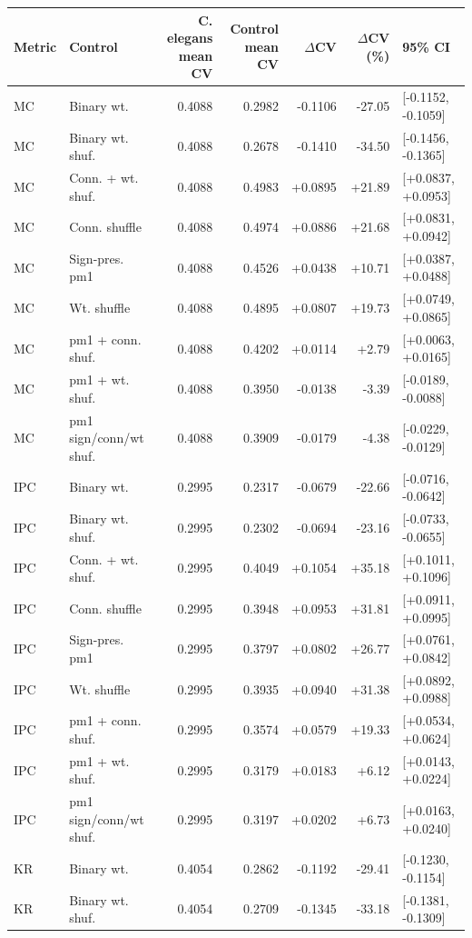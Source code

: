 \begin{tabular}{llrrrrl}
\toprule
Metric & Control & C. elegans mean CV & Control mean CV & $\Delta$CV & $\Delta$CV (\%) & 95\% CI \\
\midrule
MC & Binary wt. & 0.4088 & 0.2982 & -0.1106 & -27.05 & [-0.1152, -0.1059] \\
MC & Binary wt. shuf. & 0.4088 & 0.2678 & -0.1410 & -34.50 & [-0.1456, -0.1365] \\
MC & Conn. + wt. shuf. & 0.4088 & 0.4983 & +0.0895 & +21.89 & [+0.0837, +0.0953] \\
MC & Conn. shuffle & 0.4088 & 0.4974 & +0.0886 & +21.68 & [+0.0831, +0.0942] \\
MC & Sign-pres. pm1 & 0.4088 & 0.4526 & +0.0438 & +10.71 & [+0.0387, +0.0488] \\
MC & Wt. shuffle & 0.4088 & 0.4895 & +0.0807 & +19.73 & [+0.0749, +0.0865] \\
MC & pm1 + conn. shuf. & 0.4088 & 0.4202 & +0.0114 & +2.79 & [+0.0063, +0.0165] \\
MC & pm1 + wt. shuf. & 0.4088 & 0.3950 & -0.0138 & -3.39 & [-0.0189, -0.0088] \\
MC & pm1 sign/conn/wt shuf. & 0.4088 & 0.3909 & -0.0179 & -4.38 & [-0.0229, -0.0129] \\
IPC & Binary wt. & 0.2995 & 0.2317 & -0.0679 & -22.66 & [-0.0716, -0.0642] \\
IPC & Binary wt. shuf. & 0.2995 & 0.2302 & -0.0694 & -23.16 & [-0.0733, -0.0655] \\
IPC & Conn. + wt. shuf. & 0.2995 & 0.4049 & +0.1054 & +35.18 & [+0.1011, +0.1096] \\
IPC & Conn. shuffle & 0.2995 & 0.3948 & +0.0953 & +31.81 & [+0.0911, +0.0995] \\
IPC & Sign-pres. pm1 & 0.2995 & 0.3797 & +0.0802 & +26.77 & [+0.0761, +0.0842] \\
IPC & Wt. shuffle & 0.2995 & 0.3935 & +0.0940 & +31.38 & [+0.0892, +0.0988] \\
IPC & pm1 + conn. shuf. & 0.2995 & 0.3574 & +0.0579 & +19.33 & [+0.0534, +0.0624] \\
IPC & pm1 + wt. shuf. & 0.2995 & 0.3179 & +0.0183 & +6.12 & [+0.0143, +0.0224] \\
IPC & pm1 sign/conn/wt shuf. & 0.2995 & 0.3197 & +0.0202 & +6.73 & [+0.0163, +0.0240] \\
KR & Binary wt. & 0.4054 & 0.2862 & -0.1192 & -29.41 & [-0.1230, -0.1154] \\
KR & Binary wt. shuf. & 0.4054 & 0.2709 & -0.1345 & -33.18 & [-0.1381, -0.1309] \\

\end{tabular}
